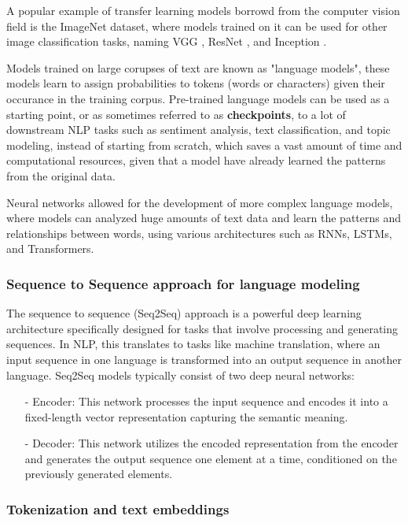 \documentclass[12.5pt]{article}
\begin{document}
A popular example of transfer learning models borrowd from the computer vision field is the ImageNet \cite{ILSVRC15} dataset, where models trained on it can be used for other image classification tasks, naming VGG \cite{Simonyan2014}, ResNet \cite{He2015}, and Inception \cite{Simonyan2014}.

Models trained on large corupses of text are known as "language models", these models learn to assign probabilities to tokens (words or characters) given their occurance in the training corpus. Pre-trained language models can be used as a starting point, or as sometimes referred to as \textbf{checkpoints}, to a lot of downstream NLP tasks such as sentiment analysis, text classification, and topic modeling, instead of starting from scratch, which saves a vast amount of time and computational resources, given that a model have already learned the patterns from the original data.

Neural networks allowed for the development of more complex language models, where models can analyzed huge amounts of text data and learn the patterns and relationships between words, using various architectures such as RNNs, LSTMs, and Transformers.

\subsubsection{Sequence to Sequence approach for language modeling}

The sequence to sequence (Seq2Seq) approach is a powerful deep learning architecture specifically designed for tasks that involve processing and generating sequences. In NLP, this translates to tasks like machine translation, where an input sequence in one language is transformed into an output sequence in another language. Seq2Seq models typically consist of two deep neural networks:
\begin{enumerate}
    \item[-] Encoder: This network processes the input sequence and encodes it into a fixed-length vector representation capturing the semantic meaning.
    \item[-] Decoder: This network utilizes the encoded representation from the encoder and generates the output sequence one element at a time, conditioned on the previously generated elements.
\end{enumerate}

\subsubsection{Tokenization and text embeddings}
\end{document}
